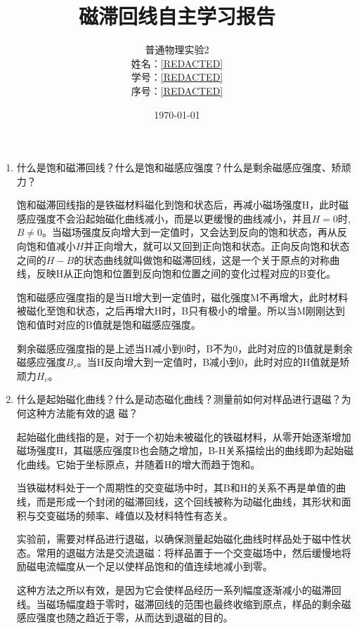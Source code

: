 \documentclass[12pt]{article}
\title{\Large\textbf {磁滞回线自主学习报告}}
\author{普通物理实验2\\
        姓名：\underline{\hspace{1cm}[REDACTED]\hspace{1cm}} \\
        学号：\underline{\hspace{0.5cm}[REDACTED]\hspace{0.5cm}} \\
        序号：\underline{\hspace{1.3cm}[REDACTED]\hspace{1.3cm}}}
\date{\today}
\newcommand{\question}[1]{{\CJKfamily{kaishu}#1}}
\begin{document}
\maketitle
\begin{enumerate}
    \item \question{什么是饱和磁滞回线？什么是饱和磁感应强度？什么是剩余磁感应强度、矫顽力？}
    \par
    \hspace{1em}饱和磁滞回线指的是铁磁材料磁化到饱和状态后，再减小磁场强度H，此时磁感应强度不会沿起始磁化曲线减小，而是以更缓慢的曲线减小，并且$H=0$时,$B\neq 0$。当磁场强度反向增大到一定值时，又会达到反向的饱和状态，再从反向饱和值减小$H$并正向增大，就可以又回到正向饱和状态。正向反向饱和状态之间的$H-B$的状态曲线就叫做饱和磁滞回线，这是一个关于原点的对称曲线，反映H从正向饱和位置到反向饱和位置之间的变化过程对应的B变化。
    \par
    \hspace{1em}饱和磁感应强度指的是当H增大到一定值时，磁化强度M不再增大，此时材料被磁化至饱和状态，之后再增大H时，B只有极小的增量。所以当M刚刚达到饱和值时对应的B值就是饱和磁感应强度。
    \par
    \hspace{1em}剩余磁感应强度指的是上述当H减小到0时，B不为0，此时对应的B值就是剩余磁感应强度$B_r$。当H反向增大到一定值时，B减小到0，此时对应的H值就是矫顽力$H_c$。
    \item \question{什么是起始磁化曲线？什么是动态磁化曲线？测量前如何对样品进行退磁？为何这种方法能有效的退
    磁？}
    \par
    \hspace{1em}起始磁化曲线指的是，对于一个初始未被磁化的铁磁材料，从零开始逐渐增加磁场强度H，其磁感应强度B也会随之增加，B-H关系描绘出的曲线即为起始磁化曲线。它始于坐标原点，并随着H的增大而趋于饱和。
    \par
    \hspace{1em}当铁磁材料处于一个周期性的交变磁场中时，其B和H的关系不再是单值的曲线，而是形成一个封闭的磁滞回线，这个回线被称为动磁化曲线，其形状和面积与交变磁场的频率、峰值以及材料特性有态关。
    \par
    \hspace{1em}实验前，需要对样品进行退磁，以确保测量起始磁化曲线时样品处于磁中性状态。常用的退磁方法是交流退磁：将样品置于一个交变磁场中，然后缓慢地将励磁电流幅度从一个足以使样品饱和的值连续地减小到零。
    \par
    \hspace{1em}这种方法之所以有效，是因为它会使样品经历一系列幅度逐渐减小的磁滞回线。当磁场幅度趋于零时，磁滞回线的范围也最终收缩到原点，样品的剩余磁感应强度也随之趋近于零，从而达到退磁的目的。

\end{enumerate}
\end{document}
